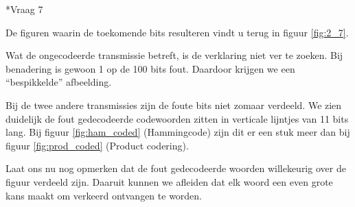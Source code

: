 \documentclass[]{article}
\begin{document}
\begin{section}
    \begin{subsection}*{Vraag 7} %

        De figuren waarin de toekomende bits resulteren vindt u terug
        in figuur \ref{fig:2_7}.

        Wat de ongecodeerde transmissie betreft, is de verklaring niet
        ver te zoeken. Bij benadering is gewoon 1 op de 100 bits fout.
        Daardoor krijgen we een ``bespikkelde'' afbeelding.

        Bij de twee andere transmissies zijn de foute bits niet zomaar
        verdeeld. We zien duidelijk de fout gedecodeerde codewoorden
        zitten in verticale lijntjes van 11 bits lang. Bij figuur
        \ref{fig:ham_coded} (Hammingcode) zijn dit er een stuk
        meer dan bij figuur \ref{fig:prod_coded} (Product codering).

        Laat ons nu nog opmerken dat de fout gedecodeerde woorden
        willekeurig over de figuur verdeeld zijn. Daaruit kunnen we
        afleiden dat elk woord een even grote kans maakt om verkeerd
        ontvangen te worden.

        \begin{figure}
            \centering


\end{figure}
\end{subsection}
\end{section}
\end{document}
